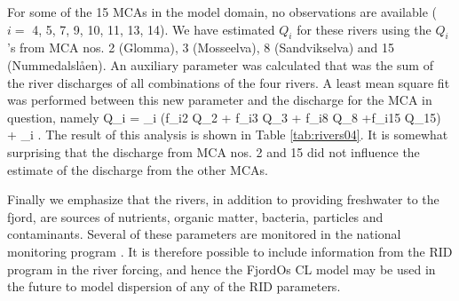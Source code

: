 For some of the 15 MCAs in the model domain, no observations are available ($i=$ 4, 5, 7, 9, 10, 11, 13, 14). We have estimated $Q_i$ for these rivers using the $Q_i$'s from MCA nos. 2 (Glomma), 3 (Mosseelva), 8 (Sandvikselva) and 15 (Nummedalsl{\aa}en). An auxiliary parameter was calculated that was the sum of the river discharges of all combinations of the four rivers. A least mean square fit was performed between this new parameter and the discharge for the MCA in question, namely 
\be
 \label{eq:riv05}
 Q_i = \alpha_i \left(f_{i2} Q_2 + f_{i3} Q_3 + f_{i8} Q_8 +f_{i15} Q_{15}\right) + \beta_i .
\ee
The result of this analysis is shown in Table \ref{tab:rivers04}. It is somewhat surprising that the discharge from MCA nos. 2 and 15 did not influence the estimate of the discharge from the other MCAs.   


Finally we emphasize that the rivers, in addition to providing freshwater to the fjord, are sources of nutrients, organic matter, bacteria, particles and contaminants. Several of these parameters are monitored in the national monitoring program \citep[Riverine Inputs and direct Discharges - RID,][]{skarb:etal:2011}. It is therefore possible to include information from the RID program in the river forcing, and hence the FjordOs CL model may be used in the future to model dispersion of any of the RID parameters.





